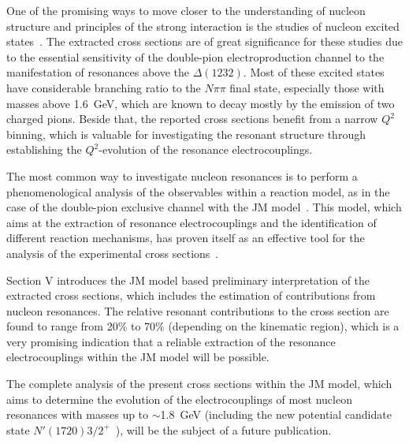 \documentclass[prc,twocolumn,superscriptaddress,showpacs,amssymb,amsmath,amsfonts,aps,nofootinbib]{revtex4-1}
\begin{document}
One of the promising ways to move closer to the understanding of nucleon structure and principles of the strong interaction is the studies of nucleon excited states~\cite{Burkert:2016kyi,Krusche:2003ik,Aznauryan:2011qj,Skorodumina:2016pnb}.
The extracted cross sections are of great significance for these studies due to the essential sensitivity of the double-pion electroproduction channel to the manifestation of resonances above the $\Delta(1232)$. Most of these excited states have considerable branching ratio to the $N\pi\pi$ final state, especially those with masses above 1.6~GeV, which are known to decay mostly by the emission of two charged pions. Beside that, the reported cross sections benefit from a narrow $Q^{2}$ binning, which is valuable for investigating the resonant structure  through establishing the $Q^{2}$-evolution of the resonance electrocouplings. 


The most common way to investigate  nucleon resonances  is to perform a phenomenological analysis of the observables within a reaction model, as in the case of the double-pion exclusive channel with the JM  model~\cite{Mokeev:2015lda}. This model, which aims at the extraction of resonance electrocouplings and the identification of different reaction mechanisms, has proven itself as an effective tool for the analysis of the experimental cross sections~\cite{Mokeev:2008iw,Mokeev:2012vsa,Mokeev:2015lda}.




Section V introduces the JM model based preliminary interpretation of the extracted cross sections, which includes the estimation of  contributions from nucleon resonances. 
The relative resonant contributions to the cross section are found to range from 20\% to 70\% (depending on the kinematic region), which is a very promising indication that a reliable extraction of the resonance electrocouplings within the JM model will be possible.


The complete analysis of the present cross sections within the JM model, which aims to determine the evolution of the electrocouplings of most nucleon resonances  with masses up to $\sim$1.8~GeV (including the new potential candidate state
$N'(1720)3/2^+$~\cite{Mokeev:2015moa}), will be the subject of a future publication. 
\end{document}
